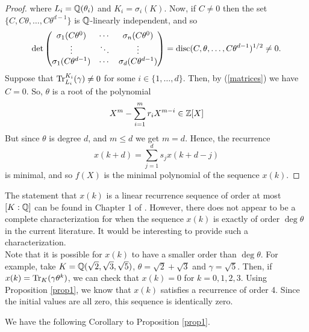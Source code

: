 \documentclass[11pt]{amsart}
\begin{document}
\begin{prop}
\begin{proof}
where $L_i=\mathbb{Q}(\theta_i)$ and $K_i=\sigma_i(K)$. Now, if $C \not=0$ then the set $\{C, C\theta, \dots, C\theta^{d-1}\}$ is $\mathbb{Q}$-linearly independent, and so
\[\det \begin{pmatrix} \sigma_1(C \theta^0) & \cdots & \sigma_n(C \theta^0) \\ \vdots & \ddots & \vdots \\ \sigma_1(C \theta^{d-1}) & \cdots & \sigma_d(C \theta^{d-1}) \end{pmatrix} =\operatorname{disc}(C, \theta, \dots, C\theta^{d-1})^{1/2} \not=0.\]
Suppose that $\operatorname{Tr}_{L_i}^{K_i}(\gamma)\not=0$ for some $i \in \{1, \dots, d\}$. Then, by (\ref{matrices}) we have $C=0$. So, $\theta$ is a root of the polynomial
\[X^m-\sum_{i=1}^m r_i X^{m-i} \in \mathbb{Z}[X]\]
But since $\theta$ is degree $d$, and $m \leq d$ we get $m=d$. Hence, the recurrence
\[x(k+d)=\sum_{j=1}^d s_j x(k+d-j)\]
is minimal, and so $f(X)$ is the minimal polynomial of the sequence $x(k)$.
\end{proof} 
 \end{prop}


\begin{rmk} The statement that $x(k)$ is a linear recurrence sequence of order at most $[K: \mathbb{Q}]$ can be found in Chapter 1 of \cite{recurrence}. However, there does not appear to be a complete characterization for when the sequence $x(k)$ is exactly of order $\deg\theta$ in the current literature. It would be interesting to provide such a characterization.\\

Note that it is possible for $x(k)$ to have a smaller order than $\deg \theta$. For example, take $K=\mathbb{Q}(\sqrt{2}, \sqrt{3}, \sqrt{5})$, $\theta=\sqrt{2}+\sqrt{3}$ and $\gamma=\sqrt{5}$. Then, if $x(k)=\operatorname{Tr}_K(\gamma \theta^k)$, we can check that $x(k)=0$ for $k=0, 1, 2, 3$. Using Proposition \ref{prop1}, we know that $x(k)$ satisfies a recurrence of order 4. Since the initial values are all zero, this sequence is identically zero. 
\end{rmk}

We have the following Corollary to Proposition \ref{prop1}.
\end{document}
